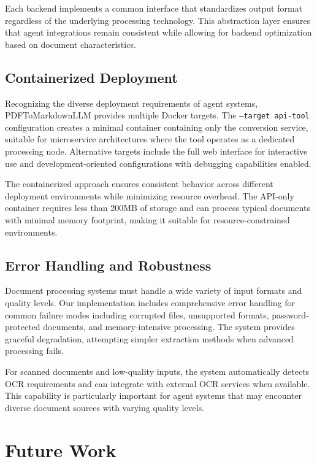 \documentclass{article}
\begin{document}
Each backend implements a common interface that standardizes output format regardless of the underlying processing technology. This abstraction layer ensures that agent integrations remain consistent while allowing for backend optimization based on document characteristics.

\subsection{Containerized Deployment}

Recognizing the diverse deployment requirements of agent systems, PDFToMarkdownLLM provides multiple Docker targets. The \texttt{--target api-tool} configuration creates a minimal container containing only the conversion service, suitable for microservice architectures where the tool operates as a dedicated processing node. Alternative targets include the full web interface for interactive use and development-oriented configurations with debugging capabilities enabled.

The containerized approach ensures consistent behavior across different deployment environments while minimizing resource overhead. The API-only container requires less than 200MB of storage and can process typical documents with minimal memory footprint, making it suitable for resource-constrained environments.

\subsection{Error Handling and Robustness}

Document processing systems must handle a wide variety of input formats and quality levels. Our implementation includes comprehensive error handling for common failure modes including corrupted files, unsupported formats, password-protected documents, and memory-intensive processing. The system provides graceful degradation, attempting simpler extraction methods when advanced processing fails.

For scanned documents and low-quality inputs, the system automatically detects OCR requirements and can integrate with external OCR services when available. This capability is particularly important for agent systems that may encounter diverse document sources with varying quality levels.


\section{Future Work}
\end{document}
